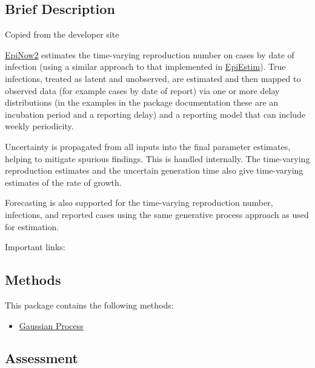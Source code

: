 \documentclass[
  letterpaper,
  DIV=11,
  numbers=noendperiod]{scrreprt}
\providecommand{\tightlist}{%
  \setlength{\itemsep}{0pt}\setlength{\parskip}{0pt}}\usepackage{longtable,booktabs,array}
\begin{document}
\subsection*{Brief Description}\label{brief-description-9}

Copied from the developer site

\href{package_EpiNow2.qmd}{EpiNow2} estimates the time-varying
reproduction number on cases by date of infection (using a similar
approach to that implemented in \href{package_EpiEstim.qmd}{EpiEstim}).
True infections, treated as latent and unobserved, are estimated and
then mapped to observed data (for example cases by date of report) via
one or more delay distributions (in the examples in the package
documentation these are an incubation period and a reporting delay) and
a reporting model that can include weekly periodicity.

Uncertainty is propagated from all inputs into the final parameter
estimates, helping to mitigate spurious findings. This is handled
internally. The time-varying reproduction estimates and the uncertain
generation time also give time-varying estimates of the rate of growth.

Forecasting is also supported for the time-varying reproduction number,
infections, and reported cases using the same generative process
approach as used for estimation.

Important links:

\subsection*{Methods}\label{methods-8}

This package contains the following methods:

\begin{itemize}
\tightlist
\item
  \hyperref[sec-gaussianprocess]{Gaussian Process}
\end{itemize}

\subsection*{Assessment}\label{assessment-8}
\end{document}
